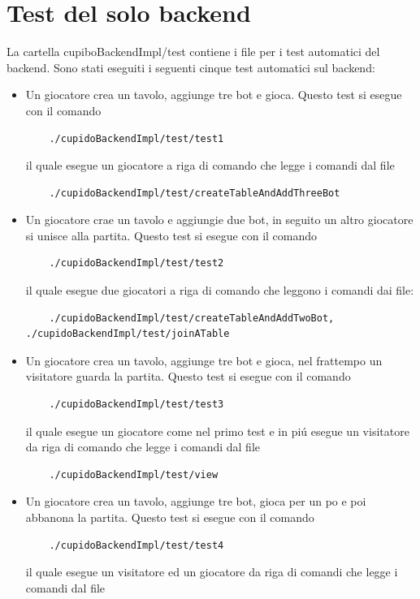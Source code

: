 \section{Test del solo backend}
  La cartella cupiboBackendImpl/test contiene i file per i test automatici del backend. Sono stati eseguiti i seguenti cinque test automatici sul backend:
  \begin{itemize}
    \item 
      Un giocatore crea un tavolo, aggiunge tre bot e gioca. Questo test si esegue con il comando
      \begin{verbatim}
	./cupidoBackendImpl/test/test1
      \end{verbatim}
      il quale esegue un giocatore a riga di comando che legge i comandi dal file 
      \begin{verbatim}
	./cupidoBackendImpl/test/createTableAndAddThreeBot
      \end{verbatim}
    \item
      Un giocatore crae un tavolo e aggiungie due bot, in seguito un altro giocatore si unisce alla partita. Questo test si esegue con il comando
      \begin{verbatim}
	./cupidoBackendImpl/test/test2
      \end{verbatim}
      il quale esegue due giocatori a riga di comando che leggono i comandi dai file:
      \begin{verbatim}
	./cupidoBackendImpl/test/createTableAndAddTwoBot, ./cupidoBackendImpl/test/joinATable
      \end{verbatim}
    \item
      Un giocatore crea un tavolo, aggiunge tre bot e gioca, nel frattempo un visitatore guarda la partita. Questo test si esegue con il comando
      \begin{verbatim}
	./cupidoBackendImpl/test/test3
      \end{verbatim}
      il quale esegue un giocatore come nel primo test e in pi\'u esegue un visitatore da riga di comando che legge i comandi dal file
      \begin{verbatim}
	./cupidoBackendImpl/test/view
      \end{verbatim}
    \item
      Un giocatore crea un tavolo, aggiunge tre bot, gioca per un po e poi abbanona la partita. Questo test si esegue con il comando
      \begin{verbatim}
	./cupidoBackendImpl/test/test4
      \end{verbatim}
      il quale esegue un visitatore ed un giocatore da riga di comandi che legge i comandi dal file 

\end{itemize}
